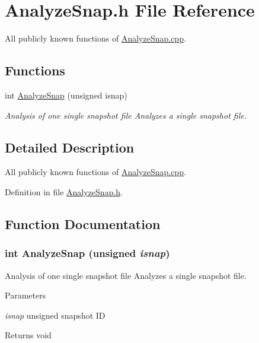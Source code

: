 \section{AnalyzeSnap.h File Reference}
\label{AnalyzeSnap_8h}


All publicly known functions of \hyperlink{AnalyzeSnap_8cpp}{AnalyzeSnap.cpp}.  


\subsection*{Functions}
\begin{DoxyCompactItemize}
\item 
int \hyperlink{AnalyzeSnap_8h_a6516204219d1a28db3f597b008102243}{AnalyzeSnap} (unsigned isnap)
\begin{DoxyCompactList}\small\item\em Analysis of one single snapshot file Analyzes a single snapshot file. \item\end{DoxyCompactList}\end{DoxyCompactItemize}


\subsection{Detailed Description}
All publicly known functions of \hyperlink{AnalyzeSnap_8cpp}{AnalyzeSnap.cpp}. 

Definition in file \hyperlink{AnalyzeSnap_8h_source}{AnalyzeSnap.h}.



\subsection{Function Documentation}
\subsubsection[{AnalyzeSnap}]{\setlength{\rightskip}{0pt plus 5cm}int AnalyzeSnap (unsigned {\em isnap})}\label{AnalyzeSnap_8h_a6516204219d1a28db3f597b008102243}


Analysis of one single snapshot file Analyzes a single snapshot file. 


\begin{DoxyParams}{Parameters}
\item[{\em isnap}]unsigned snapshot ID \end{DoxyParams}
\begin{DoxyReturn}{Returns}
void 
\end{DoxyReturn}



